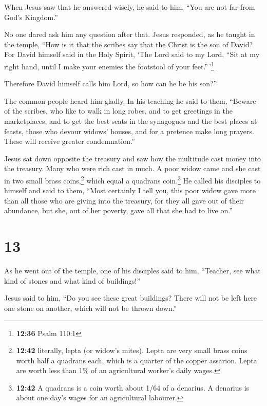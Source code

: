  When Jesus saw that he answered wisely, he said to him,
``You are not far from God's Kingdom.''

No one dared ask him any question after that.  Jesus
responded, as he taught in the temple, ``How is it that the scribes say
that the Christ is the son of David?  For David himself
said in the Holy Spirit, `The Lord said to my Lord, ``Sit at my right
hand, until I make your enemies the footstool of your
feet.''\,'\footnote{\textbf{12:36} Psalm 110:1}

 Therefore David himself calls him Lord, so how can he be
his son?''

The common people heard him gladly.  In his teaching he
said to them, ``Beware of the scribes, who like to walk in long robes,
and to get greetings in the marketplaces,  and to get the
best seats in the synagogues and the best places at feasts,
 those who devour widows' houses, and for a pretence make
long prayers. These will receive greater condemnation.''

 Jesus sat down opposite the treasury and saw how the
multitude cast money into the treasury. Many who were rich cast in much.
 A poor widow came and she cast in two small brass
coins,\footnote{\textbf{12:42} literally, lepta (or widow's mites).
  Lepta are very small brass coins worth half a quadrans each, which is
  a quarter of the copper assarion. Lepta are worth less than 1\% of an
  agricultural worker's daily wages.} which equal a quadrans
coin.\footnote{\textbf{12:42} A quadrans is a coin worth about 1/64 of a
  denarius. A denarius is about one day's wages for an agricultural
  labourer.}  He called his disciples to himself and said
to them, ``Most certainly I tell you, this poor widow gave more than all
those who are giving into the treasury,  for they all
gave out of their abundance, but she, out of her poverty, gave all that
she had to live on.''

\hypertarget{section-12}{%
\section{13}\label{section-12}}

 As he went out of the temple, one of his disciples said
to him, ``Teacher, see what kind of stones and what kind of buildings!''

 Jesus said to him, ``Do you see these great buildings?
There will not be left here one stone on another, which will not be
thrown down.''

